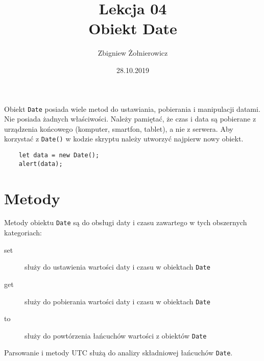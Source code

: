 \documentclass[a4paper]{article}
\begin{document}
\title{{\huge Lekcja 04} \\
    {\Large Obiekt Date}}
\author{Zbigniew Żołnierowicz}
\date{28.10.2019}
\maketitle
Obiekt \texttt{Date} posiada wiele metod do ustawiania, pobierania i manipulacji datami.
Nie posiada żadnych właściwości. Należy pamiętać, że czas i data są pobierane z urządzenia końcowego (komputer, smartfon, tablet), a nie z serwera.
Aby korzystać z \texttt{Date()} w kodzie skryptu należy utworzyć najpierw nowy obiekt.
\begin{verbatim}
    let data = new Date();
    alert(data);
\end{verbatim}
\section{Metody}
Metody obiektu \texttt{Date} są do obsługi daty i czasu zawartego w tych obszernych kategoriach:
\begin{description}
    \item[set] służy do ustawienia wartości daty i czasu w obiektach \texttt{Date}
    \item[get] służy do pobierania wartości daty i czasu w obiektach \texttt{Date}
    \item[to] służy do powtórzenia łańcuchów wartości z obiektów \texttt{Date}
\end{description}
Parsowanie i metody UTC służą do analizy składniowej łańcuchów \texttt{Date}.
\end{document}
